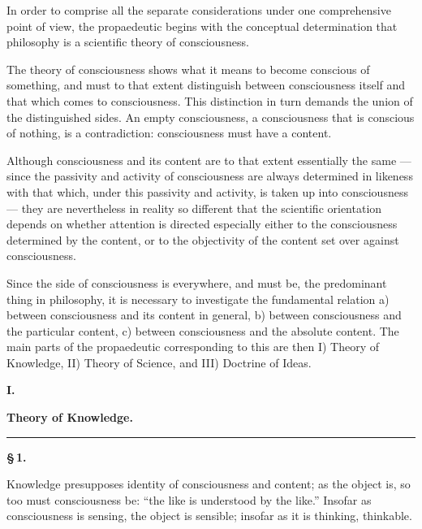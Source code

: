 \documentclass[12pt]{book}
\begin{document}
In order to comprise all the separate considerations under one comprehensive
point of view, the propaedeutic begins with the conceptual determination that
philosophy is a scientific theory of consciousness.

The theory of consciousness shows what it means to become conscious of
something, and must to that extent distinguish between consciousness itself and
that which comes to consciousness. This distinction in turn demands the union of
the distinguished sides. An empty consciousness, a consciousness that is
conscious of nothing, is a contradiction: consciousness must have a content.

Although consciousness and its content are to that extent essentially the same
--- since the passivity and activity of consciousness are always determined in
likeness with that which, under this passivity and activity, is taken up into
consciousness --- they are nevertheless in reality so different that the
scientific orientation depends on whether attention is directed especially
either to
the consciousness determined by the content, or to the objectivity of the
content set over against consciousness.

Since the side of consciousness is everywhere, and must be, the predominant
thing in philosophy, it is necessary to investigate the fundamental relation
a) between consciousness and its content in general, b) between consciousness
and the particular content, c) between consciousness and the absolute content.
The main parts of the propaedeutic corresponding to this are then I) Theory of
Knowledge, II) Theory of Science, and III) Doctrine of Ideas.

\begin{center}
  {\large\bfseries I.}\par\vspace{4pt}
  {\Large\bfseries Theory of Knowledge.}\par\vspace{4pt}
  \rule{2.5cm}{0.4pt}
\end{center}
{}

\begin{center}{\bfseries \S\,1.}\end{center}

\noindent Knowledge presupposes identity of consciousness and content; as the
object is, so too must consciousness be: ``the like is understood by the like.''
Insofar as consciousness is sensing, the object is sensible; insofar as it is
thinking, thinkable.
\end{document}
